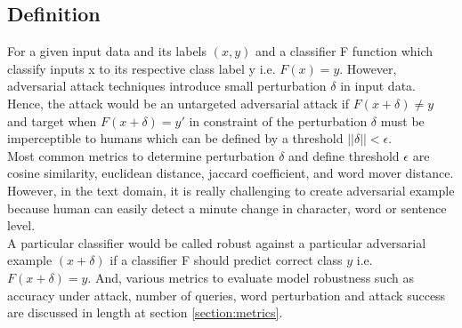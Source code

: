 \documentclass[%
	BCOR=8mm, %
	DIV=12,
	toc=bibliography, %
	toc=listof, %
	oneside, %
	egregdoesnotlikesansseriftitles, %
	]{scrbook}
\begin{document}
\subsection{Definition}
\label{subsection:definition}
For a given input data and its labels $(x, y)$ and a classifier F function which classify inputs x to its respective class label y i.e. $F (x) = y$. However, adversarial attack techniques introduce small perturbation $\delta$ in input data.\\
Hence, the attack would be an untargeted adversarial attack if $F(x+\delta)\not=y$ and target when $F(x+\delta)=y'$ in constraint of the perturbation $\delta$ must be imperceptible to humans which can be defined by a threshold  $||\delta||<\epsilon$. \\
Most common metrics to determine perturbation $\delta$ and define threshold $\epsilon$ are cosine similarity, euclidean distance, jaccard coefficient, and word mover distance.  However, in the text domain, it is really challenging to create adversarial example because human can easily detect a minute change in character, word or sentence level.\\
A particular classifier would be called robust against a particular adversarial example  $(x+\delta)$ if a classifier F should predict correct class $y$  i.e.  $F(x+\delta)=y$. And, various metrics to evaluate model robustness such as accuracy under attack, number of queries, word perturbation and  attack success are discussed in length at section \ref{section:metrics}.
\end{document}
